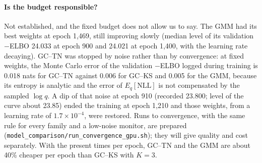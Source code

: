 \documentclass[11pt]{article}
\begin{document}
\paragraph{Is the budget responsible?} Not established, and the fixed budget does not allow us to say. The GMM had its
best weights at epoch 1,469, still improving slowly (median level of its validation $-$ELBO 24.033 at epoch 900 and 24.021
at epoch 1,400, with the learning rate decaying). GC--TN was stopped by noise rather than by convergence: at fixed
weights, the Monte Carlo error of the validation $-$ELBO logged during training is 0.018 nats for GC--TN against 0.006 for
GC--KS and 0.005 for the GMM, because its entropy is analytic and the error of $E_q[\mathrm{NLL}]$ is not compensated by
the sampled $\log q$. A dip of that noise at epoch 910 (recorded 23.800; level of the curve about 23.85) ended the
training at epoch 1,210 and those weights, from a learning rate of $1.7\times10^{-4}$, were restored. Runs to convergence,
with the same rule for every family and a low-noise monitor, are prepared
(\texttt{model\_comparison/run\_convergence\_gpu.sh}); they will give quality and cost separately. With the present
times per epoch, GC--TN and the GMM are about 40\% cheaper per epoch than GC--KS with $K=3$.

\end{document}
